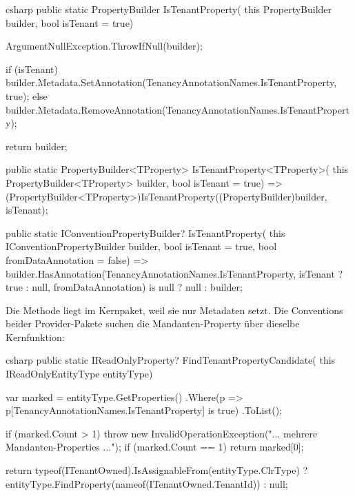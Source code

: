 \begin{sourcecode}{csharp}
public static PropertyBuilder IsTenantProperty(
    this PropertyBuilder builder, bool isTenant = true)
{
    ArgumentNullException.ThrowIfNull(builder);

    if (isTenant)
        builder.Metadata.SetAnnotation(TenancyAnnotationNames.IsTenantProperty, true);
    else
        builder.Metadata.RemoveAnnotation(TenancyAnnotationNames.IsTenantProperty);

    return builder;
}

public static PropertyBuilder<TProperty> IsTenantProperty<TProperty>(
    this PropertyBuilder<TProperty> builder, bool isTenant = true)
    => (PropertyBuilder<TProperty>)IsTenantProperty((PropertyBuilder)builder, isTenant);

public static IConventionPropertyBuilder? IsTenantProperty(
    this IConventionPropertyBuilder builder,
    bool isTenant = true,
    bool fromDataAnnotation = false)
    => builder.HasAnnotation(TenancyAnnotationNames.IsTenantProperty,
           isTenant ? true : null, fromDataAnnotation) is null
        ? null
        : builder;
\end{sourcecode}

Die Methode liegt im Kernpaket, weil sie nur Metadaten setzt. Die Conventions beider
Provider-Pakete suchen die Mandanten-Property über dieselbe Kernfunktion:

\begin{sourcecode}{csharp}
public static IReadOnlyProperty? FindTenantPropertyCandidate(
    this IReadOnlyEntityType entityType)
{
    var marked = entityType.GetProperties()
        .Where(p => p[TenancyAnnotationNames.IsTenantProperty] is true)
        .ToList();

    if (marked.Count > 1)
        throw new InvalidOperationException("... mehrere Mandanten-Properties ...");
    if (marked.Count == 1)
        return marked[0];

    return typeof(ITenantOwned).IsAssignableFrom(entityType.ClrType)
        ? entityType.FindProperty(nameof(ITenantOwned.TenantId))
        : null;
}
\end{sourcecode}

